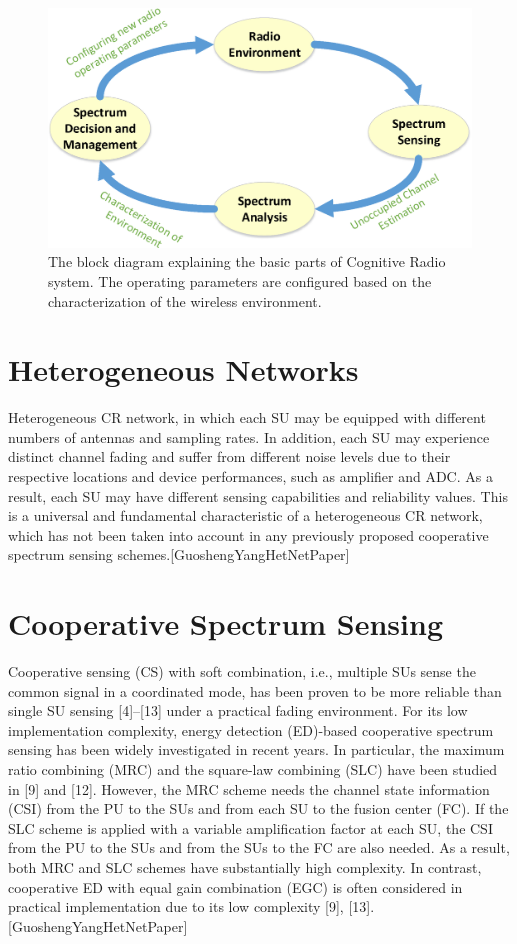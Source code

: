 \begin{figure}[ht!]
	\centering
	\includegraphics[width=\textwidth,keepaspectratio]{images/Gill/figs/cognitive_radio.eps}
    \caption{The block diagram explaining the basic parts of Cognitive Radio system. The operating parameters are configured based on the characterization of the wireless environment.} 
\label{cograd}      
\end{figure}

\section{Heterogeneous Networks}
Heterogeneous CR network, in which each SU may be equipped with different numbers of antennas and sampling
rates. In addition, each SU may experience distinct channel fading and suffer from different noise levels due to their respective
locations and device performances, such as amplifier and ADC. As a result, each SU may have different sensing capabilities
and reliability values. This is a universal and fundamental characteristic of a heterogeneous CR network, which has not
been taken into account in any previously proposed cooperative spectrum sensing schemes.[GuoshengYangHetNetPaper]

\section{Cooperative Spectrum Sensing}
Cooperative sensing (CS) with soft combination, i.e., multiple SUs sense the common signal in a coordinated mode,
has been proven to be more reliable than single SU sensing [4]–[13] under a practical fading environment. For its low
implementation complexity, energy detection (ED)-based cooperative spectrum sensing has been widely investigated in recent
years. In particular, the maximum ratio combining (MRC) and the square-law combining (SLC) have been studied in [9]
and [12]. However, the MRC scheme needs the channel state information (CSI) from the PU to the SUs and from each SU
to the fusion center (FC). If the SLC scheme is applied with a variable amplification factor at each SU, the CSI from the PU
to the SUs and from the SUs to the FC are also needed. As a result, both MRC and SLC schemes have substantially high
complexity. In contrast, cooperative ED with equal gain combination (EGC) is often considered in practical implementation
due to its low complexity [9], [13].[GuoshengYangHetNetPaper]


